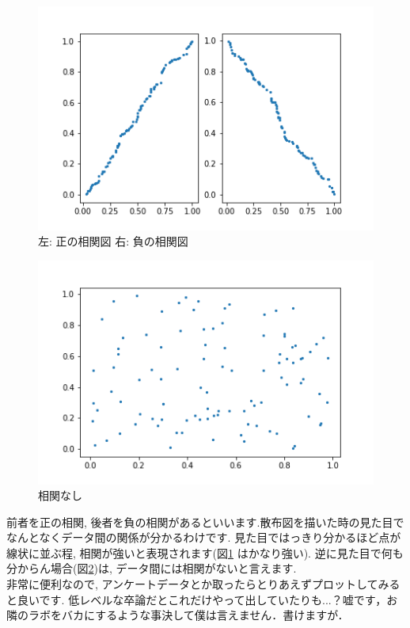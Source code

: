 \documentclass[11pt,a4paper]{jreport}
\begin{document}
\begin{figure}[H]
\label{im:scatter1}
  \centering
  \includegraphics[width=120mm,bb=0 0 432 288]{figures/scatter1.png}
  \caption{左: 正の相関図 右: 負の相関図}
\end{figure}

\begin{figure}[H]
\label{im:scatter2}
  \centering
  \includegraphics[width=120mm,bb=0 0 432 288]{figures/scatter2.png}
  \caption{相関なし}
\end{figure}

前者を正の相関, 後者を負の相関があるといいます.散布図を描いた時の見た目でなんとなくデータ間の関係が分かるわけです. 見た目ではっきり分かるほど点が線状に並ぶ程, 相関が強いと表現されます(図\ref{im:scatter1} はかなり強い). 逆に見た目で何も分からん場合(図\ref{im:scatter2})は, データ間には相関がないと言えます. \\
非常に便利なので, アンケートデータとか取ったらとりあえずプロットしてみると良いです. 低レベルな卒論だとこれだけやって出していたりも...？嘘です，お隣のラボをバカにするような事決して僕は言えません．書けますが．\\
\\
\end{document}

